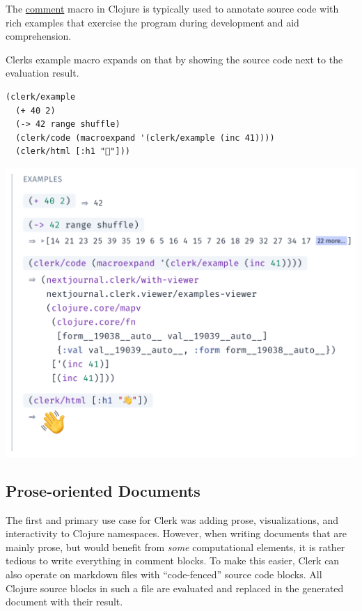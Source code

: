 \documentclass[sigconf,screen,pbalance=true]{acmart}
\begin{document}
The {\href{https://clojuredocs.org/clojure.core/comment}{comment}} macro in Clojure is typically used to annotate source code with rich examples that exercise the program during development and aid comprehension.

Clerk\textquotesingle s example macro expands on that by showing the source code next to the evaluation result.

\begin{minipage}{\linewidth}
\begin{lstlisting}
(clerk/example
  (+ 40 2)
  (-> 42 range shuffle)
  (clerk/code (macroexpand '(clerk/example (inc 41))))
  (clerk/html [:h1 "👋"]))
\end{lstlisting}
\end{minipage}

\includegraphics{images/anon-expr-5dtPQwixfSw57U4Tdiwqwrsj2tVHu1-result.png}

\hypertarget{prose-oriented-documents}{%
\subsection{Prose-oriented Documents}\label{prose-oriented-documents}}

The first and primary use case for Clerk was adding prose, visualizations, and interactivity to Clojure namespaces. However, when writing documents that are mainly prose, but would benefit from \emph{some} computational elements, it is rather tedious to write everything in comment blocks. To make this easier, Clerk can also operate on markdown files with ``code-fenced'' source code blocks. All Clojure source blocks in such a file are evaluated and replaced in the generated document with their result.
\end{document}
